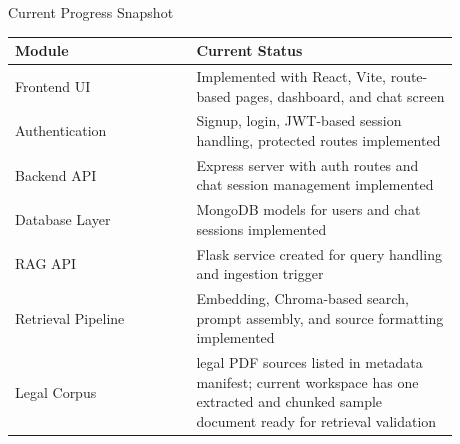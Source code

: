 \documentclass[aspectratio=169]{beamer}
\begin{document}
\begin{frame}{Current Progress Snapshot}
  \begin{table}
    \centering
    \renewcommand{\arraystretch}{1.35}
    \begin{tabular}{>{\RaggedRight\arraybackslash}p{0.36\linewidth} >{\RaggedRight\arraybackslash}p{0.52\linewidth}}
      \toprule
      \textbf{Module} & \textbf{Current Status} \\
      \midrule
      Frontend UI & Implemented with React, Vite, route-based pages, dashboard, and chat screen \\
      Authentication & Signup, login, JWT-based session handling, protected routes implemented \\
      Backend API & Express server with auth routes and chat session management implemented \\
      Database Layer & MongoDB models for users and chat sessions implemented \\
      RAG API & Flask service created for query handling and ingestion trigger \\
      Retrieval Pipeline & Embedding, Chroma-based search, prompt assembly, and source formatting implemented \\
      Legal Corpus & 18 legal PDF sources listed in metadata manifest; current workspace has one extracted and chunked sample document ready for retrieval validation \\
      \bottomrule
    \end{tabular}
  \end{table}
\end{frame}
\end{document}
